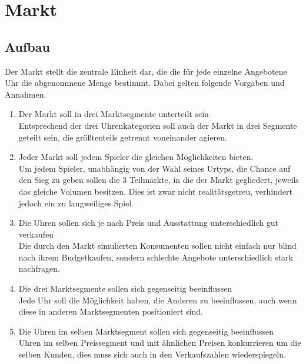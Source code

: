 \clearpage
\chapter{Markt} \label{KapitelMarkt}
\section{Aufbau}
Der Markt stellt die zentrale Einheit dar, die die für jede einzelne Angebotene Uhr die abgenommene Menge bestimmt. Dabei gelten folgende Vorgaben und Annahmen.
\begin{enumerate}
	\item Der Markt soll in drei Marktsegmente unterteilt sein
	\\ Entsprechend der drei Uhrenkategorien soll auch der Markt in drei Segmente geteilt sein, die größtenteils getrennt voneinander agieren.
	\item Jeder Markt soll jedem Spieler die gleichen Möglichkeiten bieten.
	\\ Um jedem Spieler, unabhängig von der Wahl seines Urtyps, die Chance auf den Sieg zu geben sollen die 3 Teilmärkte, in die der Markt gegliedert, jeweils das gleiche Volumen besitzen. Dies ist zwar nicht realitätsgetreu, verhindert jedoch ein zu langweiliges Spiel.
	\item Die Uhren sollen sich je nach Preis und Ausstattung unterschiedlich gut verkaufen
	\\ Die durch den Markt simulierten Konsumenten sollen nicht einfach nur blind nach ihrem Budgetkaufen, sondern schlechte Angebote unterschiedlich stark nachfragen.
	\item Die drei Marktsegmente sollen sich gegenseitig beeinflussen
	\\ Jede Uhr soll die Möglichkeit haben, die Anderen zu beeinflussen, auch wenn diese in anderen Marktsegmenten positioniert sind.
	\item Die Uhren im selben Marktsegment sollen sich gegenseitig beeinflussen
	\\ Uhren im selben Preissegment und mit ähnlichen Preisen konkurrieren um die selben Kunden, dies muss sich auch in den Verkaufszahlen wiederspiegeln.
\end{enumerate}


